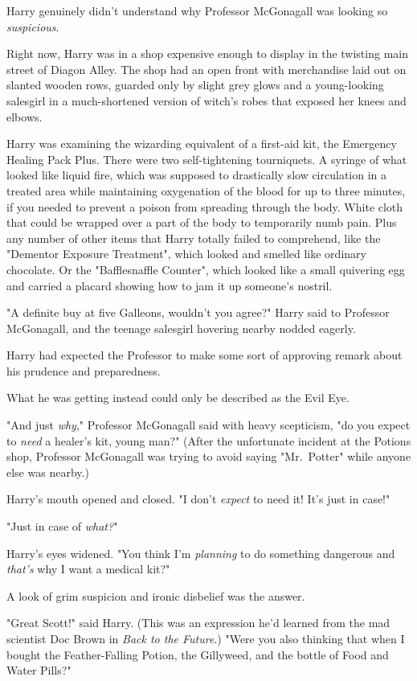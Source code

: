 Harry genuinely didn't understand why Professor McGonagall was looking so 
\emph{suspicious}.

Right now, Harry was in a shop expensive enough to display in the twisting main 
street of Diagon Alley. The shop had an open front with merchandise laid out on 
slanted wooden rows, guarded only by slight grey glows and a young-looking 
salesgirl in a much-shortened version of witch's robes that exposed her knees 
and elbows.

Harry was examining the wizarding equivalent of a first-aid kit, the Emergency 
Healing Pack Plus. There were two self-tightening tourniquets. A syringe of 
what looked like liquid fire, which was supposed to drastically slow 
circulation in a treated area while maintaining oxygenation of the blood for up 
to three minutes, if you needed to prevent a poison from spreading through the 
body. White cloth that could be wrapped over a part of the body to temporarily 
numb pain. Plus any number of other items that Harry totally failed to 
comprehend, like the "Dementor Exposure Treatment", which looked and smelled 
like ordinary chocolate. Or the "Bafflesnaffle Counter", which looked like a 
small quivering egg and carried a placard showing how to jam it up someone's 
nostril.

"A definite buy at five Galleons, wouldn't you agree?" Harry said to Professor 
McGonagall, and the teenage salesgirl hovering nearby nodded eagerly.

Harry had expected the Professor to make some sort of approving remark about 
his prudence and preparedness.

What he was getting instead could only be described as the Evil Eye.

"And just \emph{why}," Professor McGonagall said with heavy scepticism, "do you 
expect to \emph{need} a healer's kit, young man?" (After the unfortunate 
incident at the Potions shop, Professor McGonagall was trying to avoid saying 
"Mr.~Potter" while anyone else was nearby.)

Harry's mouth opened and closed. "I don't \emph{expect} to need it! It's just 
in case!"

"Just in case of \emph{what?}"

Harry's eyes widened. "You think I'm \emph{planning} to do something dangerous 
and \emph{that's} why I want a medical kit?"

A look of grim suspicion and ironic disbelief was the answer.

"Great Scott!" said Harry. (This was an expression he'd learned from the mad 
scientist Doc Brown in \emph{Back to the Future}.) "Were you also thinking that 
when I bought the Feather-Falling Potion, the Gillyweed, and the bottle of Food 
and Water Pills?"

